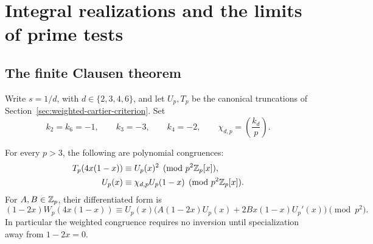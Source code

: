 \section{Integral realizations and the limits of prime tests}
\label{rev:arithmetic-details}

\subsection{The finite Clausen theorem}
\label{subsec:finite-clausen-precision}
Write $s=1/d$, with $d\in\{2,3,4,6\}$, and let $U_p,T_p$ be
the canonical truncations of Section~\ref{sec:weighted-cartier-criterion}.
Set
\[
 k_2=k_6=-1,\qquad k_3=-3,\qquad k_4=-2,\qquad
                  \chi_{d,p}=\left(\frac{k_d}{p}\right).
\]

\begin{theorem}
\label{thm:brstt-polynomial-packet}\label{cor:weighted-clausen-p2}
For every $p>3$, the following are polynomial congruences:
\begin{align}
 T_p(4x(1-x))&\equiv U_p(x)^2\pmod{p^2\mathbb Z_p[x]},
                                      \label{eq:finite-clausen-modp2}\\
 U_p(x)&\equiv\chi_{d,p}U_p(1-x)\pmod{p^2\mathbb Z_p[x]}.
                                      \label{eq:finite-reflection-p2}
\end{align}
For $A,B\in\mathbb Z_p$, their differentiated form is
\[
 (1-2x)W_p(4x(1-x))\equiv
 U_p(x)\bigl(A(1-2x)U_p(x)+2Bx(1-x)U_p'(x)\bigr)\pmod{p^2}.
\]
In particular the weighted congruence requires no inversion until
specialization away from $1-2x=0$.
\end{theorem}
